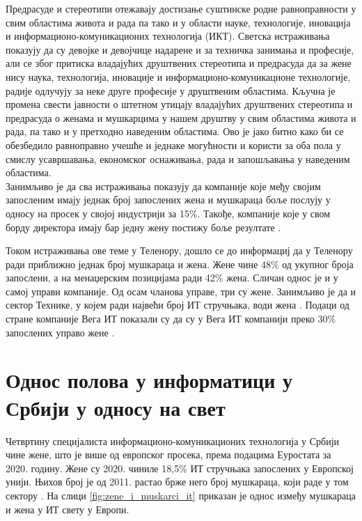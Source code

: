 \documentclass[a4paper]{article}
\begin{document}
Предрасуде и стереотипи отежавају достизање суштинске родне равноправности у
свим областима живота и рада па тако и у области науке, технологије, иновација
и информационо-комуникационих технологија (ИКТ). Светска истраживања показују
да су девојке и девојчице надарене и за техничка занимања и професије, али
се због притиска владајућих друштвених стереотипа и предрасуда да за жене
нису наука, технологија, иновације и информационо-комуникационе технологије,
радије одлучују за неке друге професије у друштвеним областима. Кључна је
промена свести јавности о штетном утицају владајућих друштвених стереотипа и
предрасуда о женама и мушкарцима у нашем друштву у свим областима живота
и рада, па тако и у претходно наведеним областима.
Ово је јако битно како би се обезбедило равноправно учешће и једнаке могућности и користи за 
оба пола у смислу усавршавања, економског оснаживања, рада и запошљавања у наведеним областима. \\

Занимљиво је да сва истраживања показују да компаније које међу својим запосленим имају једнак 
број запослених жена и мушкараца боље послују у односу на просек у својој индустрији за 15\%. 
Такође, компаније које у свом борду директора имају бар једну жену постижу боље резултате
\cite{eu_it_sektor}.

Током истраживања ове теме у Теленору, дошло се до информациј да у Теленору ради приближно једнак 
број мушкараца и жена. Жене чине 48\% од укупног броја запослени, а на менаџерским позицијама ради
42\% жена. Сличан однос је и у самој управи компаније. Од осам чланова управе, три су жене. 
Занимљиво је да и сектор Технике, у којем ради највећи број ИТ стручњака, води жена 
\cite{telenor_it}. 
Подаци од стране компаније Вега ИТ показали су да су у Вега ИТ компанији преко 30\% запослених 
управо жене \cite{vega_it}.

\section{Однос полова у информатици у Србији у односу на свет}

Четвртину специјалиста информационо-комуникационих технологија у Србији чине жене, што је 
више од европског просека, према подацима Еуростата за 2020. годину. Жене су 2020. чиниле 18,5\% 
ИТ стручњака запослених у Европској унији. Њихов број је од 2011. растао брже него број мушкараца,
који раде у том сектору \cite{danas_it}. На слици \ref{fig:zene_i_muskarci_it} приказан је
однос између мушкараца и жена у ИТ свету у Европи. \\
\end{document}
